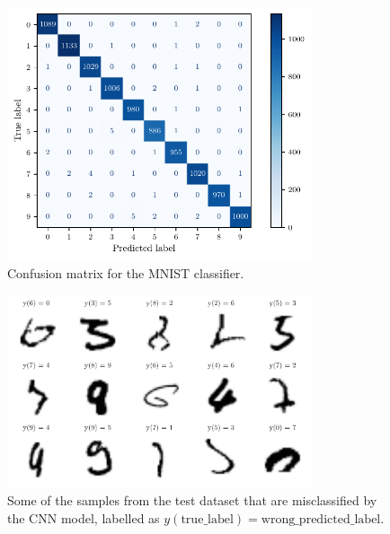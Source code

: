 \documentclass[11pt,a4paper]{scrartcl}
\begin{document}
\begin{figure}[htp]
    \centering
    \includegraphics[width=0.8\textwidth]{../02_Classification/Plots/confusion_matrix}
    \caption{Confusion matrix for the MNIST classifier.\label{fig:confusion}}
\end{figure} %

\begin{figure}[htp]
    \centering
    \includegraphics[width=0.8\textwidth]{../02_Classification/Plots/misclassified.pdf}
    \caption{Some of the samples from the test dataset that are misclassified by the CNN model, labelled as $y(\mathrm{true\_label})=\mathrm{wrong\_predicted\_label}$.\label{fig:misclassified}}
\end{figure}
\end{document}
